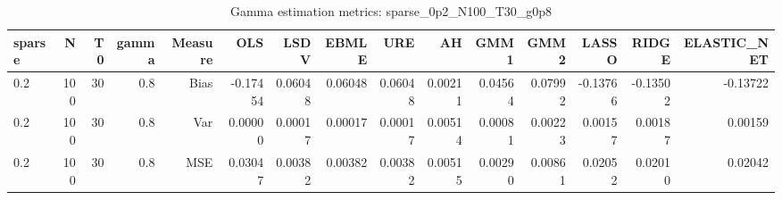 \begin{table}[!htbp]\centering
\caption{Gamma estimation metrics: sparse_0p2_N100_T30_g0p8}
\label{tab:table1_sparse_0p2_N100_T30_g0p8}
\begin{tabular}{lrrrrrrrrrrrrrr}
\hline
sparse & N & T0 & gamma & Measure & OLS & LSDV & EBMLE & URE & AH & GMM1 & GMM2 & LASSO & RIDGE & ELASTIC_NET \\
\hline
0.2 & 100 & 30 & 0.8 & Bias & -0.17454 & 0.06048 & 0.06048 & 0.06048 & 0.00211 & 0.04564 & 0.07992 & -0.13766 & -0.13502 & -0.13722 \\
0.2 & 100 & 30 & 0.8 & Var & 0.00000 & 0.00017 & 0.00017 & 0.00017 & 0.00514 & 0.00081 & 0.00223 & 0.00157 & 0.00187 & 0.00159 \\
0.2 & 100 & 30 & 0.8 & MSE & 0.03047 & 0.00382 & 0.00382 & 0.00382 & 0.00515 & 0.00290 & 0.00861 & 0.02052 & 0.02010 & 0.02042 \\
\hline
\end{tabular}
\end{table}

